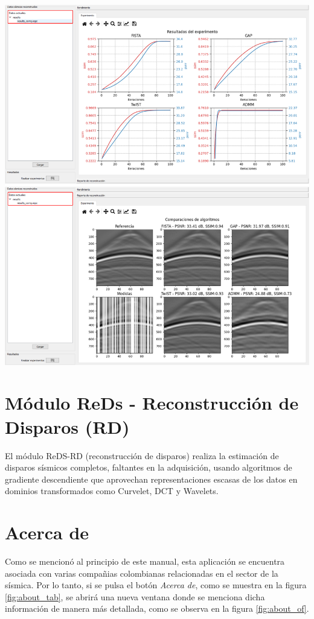 \documentclass[12pt,twoside,letter]{ol-softwaremanual}
\newenvironment{Figure}
  {\par\medskip\noindent\minipage{\linewidth}}
  {\endminipage\par\medskip}
\begin{document}
\begin{Figure}
	\centering
	\includegraphics[width=1\linewidth]{report-6.png}
	\label{fig:report_6}
\end{Figure}

\newpage
\section{Módulo ReDs - Reconstrucción de Disparos (RD)}

El módulo ReDS-RD (reconstrucción de disparos) realiza la estimación de disparos sísmicos completos, faltantes en la adquisición, usando algoritmos de gradiente descendiente que aprovechan representaciones escasas de los datos en dominios transformados como Curvelet, DCT y Wavelets.

\newpage
\section{Acerca de}

Como se mencionó al principio de este manual, esta aplicación se encuentra asociada con varias compañias colombianas relacionadas en el sector de la sísmica. Por lo tanto, si se pulsa el botón \emph{Acerca de}, como se muestra en la figura \ref{fig:about_tab}, se abrirá una nueva ventana donde se menciona dicha información de manera más detallada, como se observa en la figura \ref{fig:about_of}.
\end{document}
